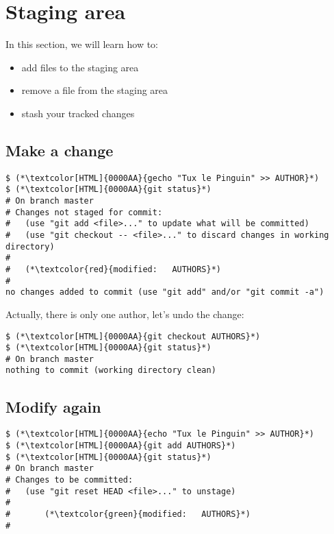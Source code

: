\section{Staging area}
\begin{frame}[fragile]
  \slidetitle

  In this section, we will learn how to:
  \begin{itemize}
    \item add files to the staging area
    \item remove a file from the staging area
    \item stash your tracked changes
  \end{itemize}
\end{frame}

\subsection{Make a change}
\begin{frame}[fragile]
\subslidetitle
\begin{lstlisting}
$ (*\textcolor[HTML]{0000AA}{gecho "Tux le Pinguin" >> AUTHOR}*)
$ (*\textcolor[HTML]{0000AA}{git status}*)
# On branch master
# Changes not staged for commit:
#   (use "git add <file>..." to update what will be committed)
#   (use "git checkout -- <file>..." to discard changes in working directory)
#
#	(*\textcolor{red}{modified:   AUTHORS}*)
#
no changes added to commit (use "git add" and/or "git commit -a")
\end{lstlisting}

Actually, there is only one author, let's undo the change:

\begin{lstlisting}
$ (*\textcolor[HTML]{0000AA}{git checkout AUTHORS}*)
$ (*\textcolor[HTML]{0000AA}{git status}*)
# On branch master
nothing to commit (working directory clean)
\end{lstlisting}
\end{frame}

\subsection{Modify again}
\begin{frame}[fragile]
\subslidetitle
\begin{lstlisting}
$ (*\textcolor[HTML]{0000AA}{echo "Tux le Pinguin" >> AUTHOR}*)
$ (*\textcolor[HTML]{0000AA}{git add AUTHORS}*)
$ (*\textcolor[HTML]{0000AA}{git status}*)
# On branch master
# Changes to be committed:
#   (use "git reset HEAD <file>..." to unstage)
#
#       (*\textcolor{green}{modified:   AUTHORS}*)
#
\end{lstlisting}
\end{frame}

